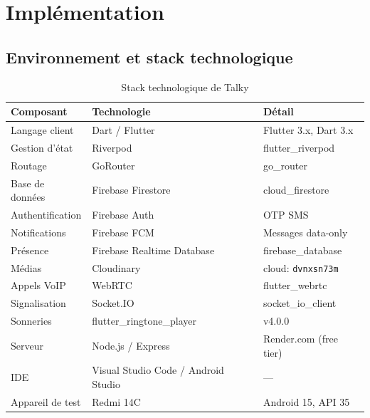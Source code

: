\documentclass[12pt,a4paper]{report}
\begin{document}
\chapter{Implémentation}

\section{Environnement et stack technologique}

\begin{table}[H]
\centering
\caption{Stack technologique de Talky}
\label{tab:stack}
\renewcommand{\arraystretch}{1.3}
\begin{tabularx}{\textwidth}{@{}llX@{}}
\toprule
\textbf{Composant} & \textbf{Technologie} & \textbf{Détail}\\\midrule
Langage client     & Dart / Flutter               & Flutter 3.x, Dart 3.x\\
Gestion d'état     & Riverpod                     & flutter\_riverpod\\
Routage            & GoRouter                     & go\_router\\
Base de données    & Firebase Firestore           & cloud\_firestore\\
Authentification   & Firebase Auth                & OTP SMS\\
Notifications      & Firebase FCM                 & Messages data-only\\
Présence           & Firebase Realtime Database   & firebase\_database\\
Médias             & Cloudinary                   & cloud: \texttt{dvnxsn73m}\\
Appels VoIP        & WebRTC                       & flutter\_webrtc\\
Signalisation      & Socket.IO                    & socket\_io\_client\\
Sonneries          & flutter\_ringtone\_player    & v4.0.0\\
Serveur            & Node.js / Express            & Render.com (free tier)\\
IDE                & Visual Studio Code / Android Studio          & ---\\
Appareil de test      & Redmi 14C                    & Android 15, API 35\\
\bottomrule
\end{tabularx}
\end{table}
\end{document}
